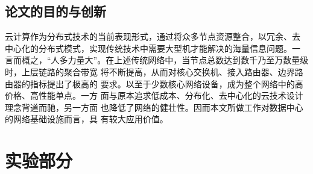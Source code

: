 \documentclass[bachelor,adobefonts]{jnuthesis} %
\begin{document}
    \section{论文的目的与创新}
    云计算作为分布式技术的当前表现形式，通过将众多节点资源整合，以冗余、去
    中心化的分布式模式，实现传统技术中需要大型机才能解决的海量信息问题。一
    言而概之，“人多力量大”。在上述传统网络中，当节点总数达到数千乃至万数量级时，上层链路的聚合带宽
    将不断提高，从而对核心交换机、接入路由器、边界路由器的指标提出了极高的
    要求。以至于少数核心网络设备，成为整个网络中的高价格、高性能单点。一方
    面与原本追求低成本、分布化、去中心化的云技术设计理念背道而驰，另一方面
    也降低了网络的健壮性。因而本文所做工作对数据中心的网络基础设施而言，具
    有较大应用价值。
    
    \chapter{实验部分}\label{chapter:experiment}
\end{document}
